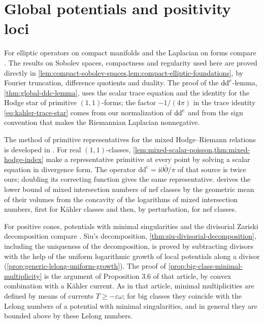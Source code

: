 \section{Global potentials and positivity loci}
\label{sec:history-global-potentials}
For elliptic operators on compact manifolds and the Laplacian on forms compare \cite[Chapter VI, Section 2, and Sections 3.1--3.2]{DemBook}. The results on Sobolev spaces, compactness and regularity used here are proved directly in \cref{lem:compact-sobolev-spaces,lem:compact-elliptic-foundations}, by Fourier truncation, difference quotients and duality. The proof of the $\mathrm{dd}^{\mathrm{c}}$-lemma, \cref{thm:global-ddc-lemma}, uses the scalar trace equation and the identity for the Hodge star of primitive $(1,1)$-forms; the factor $-1/(4\pi)$ in the trace identity \eqref{eq:kahler-trace-star} comes from our normalization of $\mathrm{dd}^{\mathrm{c}}$ and from the sign convention that makes the Riemannian Laplacian nonnegative.

The method of primitive representatives for the mixed Hodge--Riemann relations is developed in \cite[Propositions 2.3--2.4 and proof of Theorem A]{DN2005mixedv2}. For real $(1,1)$-classes, \cref{lem:mixed-scalar-poisson,thm:mixed-hodge-index} make a representative primitive at every point by solving a scalar equation in divergence form. The operator $\mathrm{dd^c}=\mathrm{i}\partial\bar\partial/\pi$ of that source is twice ours; doubling its correcting function gives the same representative.  derives the lower bound of mixed intersection numbers of nef classes by the geometric mean of their volumes from the concavity of the logarithms of mixed intersection numbers, first for K\"ahler classes and then, by perturbation, for nef classes.

For positive cones, potentials with minimal singularities and the divisorial Zariski decomposition compare \cite[Sections 2.1--2.3, Sections 2.7--2.8, and Section 3.1]{Bou04}. Siu's decomposition, \cref{thm:siu-divisorial-decomposition}, including the uniqueness of the decomposition, is proved by subtracting divisors with the help of the uniform logarithmic growth of local potentials along a divisor (\cref{prop:generic-lelong-uniform-growth}). The proof of \cref{prop:big-class-minimal-multiplicity} is the argument of Proposition 3.6 of that article, by convex combination with a K\"ahler current. As in that article, minimal multiplicities are defined by means of currents $T\geq-\varepsilon\omega$; for big classes they coincide with the Lelong numbers of a potential with minimal singularities, and in general they are bounded above by these Lelong numbers.

